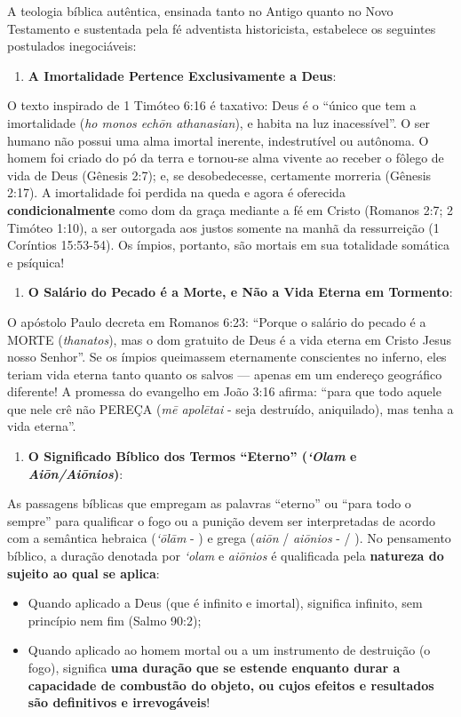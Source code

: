 \documentclass[11pt,a4paper,openany]{book}
\begin{document}
A teologia bíblica autêntica, ensinada tanto no Antigo quanto no Novo Testamento e sustentada pela fé adventista historicista, estabelece os seguintes postulados inegociáveis:

\begin{enumerate}
  \item \textbf{A Imortalidade Pertence Exclusivamente a Deus}:
\end{enumerate}

O texto inspirado de 1 Timóteo 6:16 é taxativo: Deus é o ``único que tem a imortalidade (\textit{ho monos echōn athanasian}), e habita na luz inacessível''. O ser humano não possui uma alma imortal inerente, indestrutível ou autônoma. O homem foi criado do pó da terra e tornou-se alma vivente ao receber o fôlego de vida de Deus (Gênesis 2:7); e, se desobedecesse, certamente morreria (Gênesis 2:17). A imortalidade foi perdida na queda e agora é oferecida \textbf{condicionalmente} como dom da graça mediante a fé em Cristo (Romanos 2:7; 2 Timóteo 1:10), a ser outorgada aos justos somente na manhã da ressurreição (1 Coríntios 15:53-54). Os ímpios, portanto, são mortais em sua totalidade somática e psíquica!

\begin{enumerate}
  \item \textbf{O Salário do Pecado é a Morte, e Não a Vida Eterna em Tormento}:
\end{enumerate}

O apóstolo Paulo decreta em Romanos 6:23: ``Porque o salário do pecado é a MORTE (\textit{thanatos}), mas o dom gratuito de Deus é a vida eterna em Cristo Jesus nosso Senhor''. Se os ímpios queimassem eternamente conscientes no inferno, eles teriam vida eterna tanto quanto os salvos — apenas em um endereço geográfico diferente! A promessa do evangelho em João 3:16 afirma: ``para que todo aquele que nele crê não PEREÇA (\textit{mē apolētai} - seja destruído, aniquilado), mas tenha a vida eterna''.

\begin{enumerate}
  \item \textbf{O Significado Bíblico dos Termos ``Eterno'' (\textit{‘Olam} e \textit{Aiōn/Aiōnios})}:
\end{enumerate}

As passagens bíblicas que empregam as palavras ``eterno'' ou ``para todo o sempre'' para qualificar o fogo ou a punição devem ser interpretadas de acordo com a semântica hebraica (\textit{‘ōlām} - ) e grega (\textit{aiōn} / \textit{aiōnios} - / ).
No pensamento bíblico, a duração denotada por \textit{‘olam} e \textit{aiōnios} é qualificada pela \textbf{natureza do sujeito ao qual se aplica}:
\begin{itemize}
  \item Quando aplicado a Deus (que é infinito e imortal), significa infinito, sem princípio nem fim (Salmo 90:2);
  \item Quando aplicado ao homem mortal ou a um instrumento de destruição (o fogo), significa \textbf{uma duração que se estende enquanto durar a capacidade de combustão do objeto, ou cujos efeitos e resultados são definitivos e irrevogáveis}!
\end{itemize}
\end{document}
